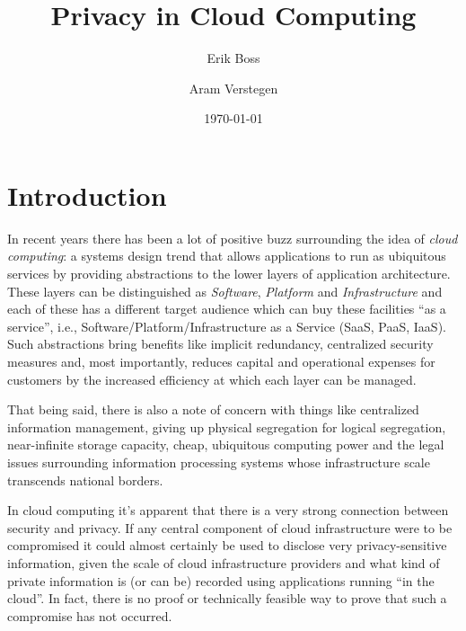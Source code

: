 \documentclass[12pt]{article}
\begin{document}
\title{Privacy in Cloud Computing}

\author{Erik Boss \and Aram Verstegen}
\date{\today}
\maketitle


\section{Introduction}
In recent years there has been a lot of positive buzz surrounding the idea of \textit{cloud computing}: a systems design trend that allows applications to run as ubiquitous services by providing abstractions to the lower layers of application architecture.
These layers can be distinguished as \textit{Software}, \textit{Platform} and \textit{Infrastructure} and each of these has a different target audience which can buy these facilities ``as a service'', i.e., Software/Platform/Infrastructure as a Service (SaaS, PaaS, IaaS). 
Such abstractions bring benefits like implicit redundancy, centralized security measures and, most importantly, reduces capital and operational expenses for customers by the increased efficiency at which each layer can be managed.

That being said, there is also a note of concern with things like centralized information management, giving up physical segregation for logical segregation, near-infinite storage capacity, cheap, ubiquitous computing power and the legal issues surrounding information processing systems whose infrastructure scale transcends national borders.

In cloud computing it's apparent that there is a very strong connection between security and privacy.
If any central component of cloud infrastructure were to be compromised it could almost certainly be used to disclose very privacy-sensitive information, given the scale of cloud infrastructure providers and what kind of private information is (or can be) recorded using applications running ``in the cloud''. In fact, there is no proof or technically feasible way to prove that such a compromise has not occurred.
\end{document}
